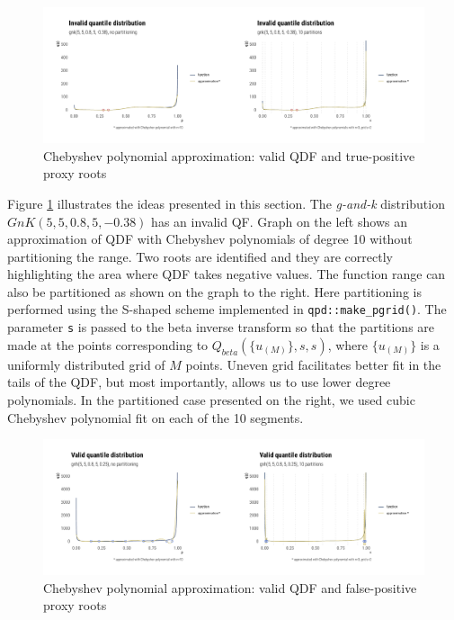 \documentclass[ba]{imsart}
\numberwithin{equation}{section}
\theoremstyle{plain}
\begin{document}
\begin{figure}

{\centering \includegraphics[width=1\linewidth]{BA-submission_files/figure-latex/chebyshev-roots-gnk-graph-1} 

}

\caption{Chebyshev polynomial approximation: valid QDF and true-positive proxy roots}\label{fig:chebyshev-roots-gnk-graph}
\end{figure}

Figure \ref{fig:chebyshev-roots-gnk-graph} illustrates the ideas presented in this section. The \emph{g-and-k} distribution \(GnK(5,5,0.8,5,-0.38)\) has an invalid QF. Graph on the left shows an approximation of QDF with Chebyshev polynomials of degree 10 without partitioning the range. Two roots are identified and they are correctly highlighting the area where QDF takes negative values. The function range can also be partitioned as shown on the graph to the right. Here partitioning is performed using the S-shaped scheme implemented in \texttt{qpd::make\_pgrid()}. The parameter \texttt{s} is passed to the beta inverse transform so that the partitions are made at the points corresponding to \(Q_{beta}(\{u_{(M)} \}, s,s)\), where \(\{u_{(M)} \}\) is a uniformly distributed grid of \(M\) points. Uneven grid facilitates better fit in the tails of the QDF, but most importantly, allows us to use lower degree polynomials. In the partitioned case presented on the right, we used cubic Chebyshev polynomial fit on each of the 10 segments.

\begin{figure}

{\centering \includegraphics[width=1\linewidth]{BA-submission_files/figure-latex/chebyshev-roots-gnh-graph-1} 

}

\caption{Chebyshev polynomial approximation: valid QDF and false-positive proxy roots}\label{fig:chebyshev-roots-gnh-graph}
\end{figure}
\end{document}
